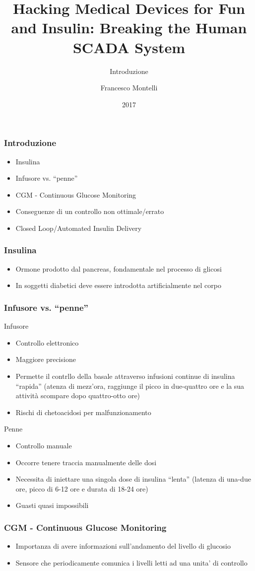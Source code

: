 \documentclass{beamer}
\title{Hacking Medical Devices for Fun and Insulin: Breaking the Human 
SCADA System}
\subtitle{Introduzione}
\author{Francesco Montelli}
\institute{CeSeNa}
\date{2017}
\begin{document}
 
\frame{\titlepage}

\begin{frame}
	\frametitle{Introduzione}
	\begin{itemize}
		\item Insulina
		\item Infusore vs. ``penne''
		\item CGM - Continuous Glucose Monitoring
		\item Conseguenze di un controllo non ottimale/errato
		\item Closed Loop/Automated Insulin Delivery
	\end{itemize}
\end{frame}
 
\begin{frame}
	\frametitle{Insulina}
	\begin{itemize}
	\item Ormone prodotto dal pancreas, fondamentale nel processo di glicosi
	\item In soggetti diabetici deve essere introdotta artificialmente nel corpo
	\end{itemize} 
\end{frame}

\begin{frame}
	\frametitle{Infusore vs. ``penne''}
	Infusore
	\begin{itemize}
		\item Controllo elettronico
		\item Maggiore precisione
		\item Permette il contrllo della basale attraverso infusioni continue di insulina ``rapida'' (atenza di mezz'ora, raggiunge il picco in due-quattro ore e la sua attività scompare dopo quattro-otto ore)
		\item Rischi di chetoacidosi per malfunzionamento
	\end{itemize}
	Penne
	\begin{itemize}
		\item Controllo manuale
		\item Occorre tenere traccia manualmente delle dosi
		\item Necessita di iniettare una singola dose di insulina ``lenta'' (latenza di una-due ore, picco di 6-12 ore e durata di 18-24 ore)
		\item Guasti quasi impossibili
	\end{itemize}
\end{frame}

\begin{frame}
\frametitle{CGM - Continuous Glucose Monitoring}
	\begin{itemize}
		\item Importanza di avere informazioni sull'andamento del livello di glucosio
		\item Sensore che periodicamente comunica i livelli letti ad una unita' di controllo
	\end{itemize}
\end{frame}
\end{document}
